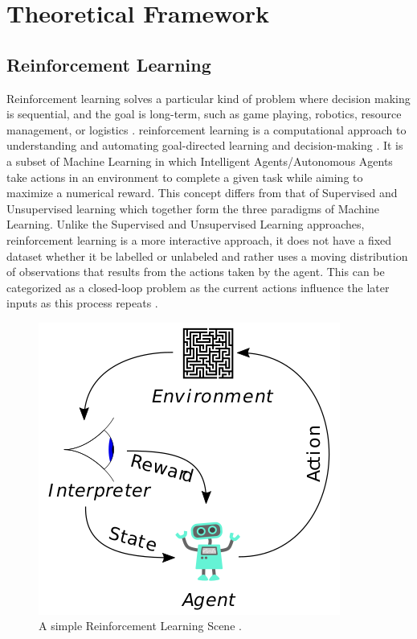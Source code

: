 \section{Theoretical Framework}

\subsection{Reinforcement Learning}

Reinforcement learning solves a particular kind of problem where decision making is sequential, and the goal is long-term, such as game playing, robotics, resource management, or logistics \cite{100PML}. reinforcement learning is a computational approach to understanding and automating goal-directed learning and decision-making \cite{Sutton1998}. It is a subset of Machine Learning in which Intelligent Agents/Autonomous Agents take actions in an environment to complete a given task while aiming to maximize a numerical reward. This concept differs from that of Supervised and Unsupervised learning which together form the three paradigms of Machine Learning. Unlike the Supervised and Unsupervised Learning approaches, reinforcement learning is a more interactive approach, it does not have a fixed dataset whether it be labelled or unlabeled and rather uses a moving distribution of observations that results from the actions taken by the agent. This can be categorized as a closed-loop problem as the current actions influence the later inputs as this process repeats \cite{Sutton1998}. \\

\begin{figure}[h!]
    \centering
    \includegraphics{images/Reinforcement_learning_diagram.svg.png}
    \caption{A simple Reinforcement Learning Scene \cite{wiki}.}
    \label{fig:RLD}
\end{figure}


